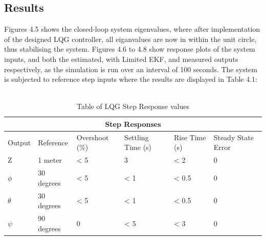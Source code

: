 \documentclass[12pt,a4paper,twoside]{report}
\begin{document}
			\subsection{Results}
				
				Figures 4.5 shows the closed-loop system eigenvalues, where after implementation of the designed LQG controller, all eiganvalues are now in within the unit circle, thus stabilising the system. Figures 4.6 to 4.8 show response plots of the system inputs, and both the estimated, with Limited EKF, and measured outputs respectively, as the simulation is run over an interval of 100 seconds. The system is subjected to reference step inputs where the results are displayed in Table 4.1:
				\\ \\
				
				\begin{table}[h!]
					\centering
					\begin{tabular}{ |p{1.5cm}|p{3cm}|p{2cm}|p{2cm}|p{2cm}|p{2cm}|  }
						\hline
						\multicolumn{6}{|c|}{Step Responses} \\
						\hline
						Output   &  Reference  & Overshoot (\%) & Settling Time (s) & Rise Time (s) & Steady State Error \\
						\hline
						Z        &  1 meter         & < 5 &  3   & < 2   & 0\\
						$\phi$   &  30 degrees      & < 5 & < 1  & < 0.5 & 0\\
						$\theta$ &  30 degrees      & < 5 & < 1  & < 0.5 & 0\\
						$\psi$   & 	90 degrees      & 0   & < 5  & < 3   & 0\\
						\hline
					\end{tabular}
					\caption{Table of LQG Step Response values}
					\label{table:lqgstepresponses}
				\end{table}
			
\end{document}
